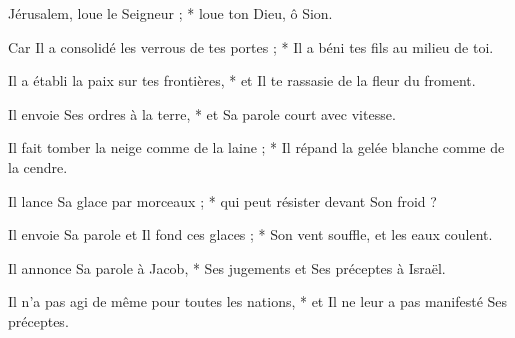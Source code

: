 \item Jérusalem, loue le Seigneur ; * loue ton Dieu, ô Sion.
\item Car Il a consolidé les verrous de tes portes ; * Il a béni tes fils au milieu de toi.
\item Il a établi la paix sur tes frontières, * et Il te rassasie de la fleur du froment.
\item Il envoie Ses ordres à la terre, * et Sa parole court avec vitesse.
\item Il fait tomber la neige comme de la laine ; * Il répand la gelée blanche comme de la cendre.
\item Il lance Sa glace par morceaux ; * qui peut résister devant Son froid ?
\item Il envoie Sa parole et Il fond ces glaces ; * Son vent souffle, et les eaux coulent.
\item Il annonce Sa parole à Jacob, * Ses jugements et Ses préceptes à Israël.
\item Il n'a pas agi de même pour toutes les nations, * et Il ne leur a pas manifesté Ses préceptes.